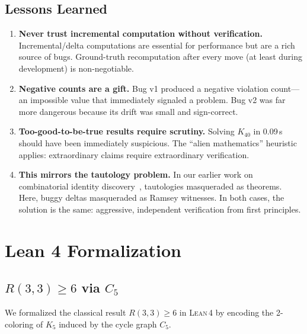 \documentclass[11pt,a4paper]{article}
\theoremstyle{definition}
\theoremstyle{remark}
\newcommand{\lean}{\textsc{Lean\,4}}
\begin{document}
\subsection{Lessons Learned}\label{sec:lessons}

\begin{enumerate}
  \item \textbf{Never trust incremental computation without verification.}
        Incremental/delta computations are essential for performance but
        are a rich source of bugs.  Ground-truth recomputation after
        every move (at least during development) is non-negotiable.

  \item \textbf{Negative counts are a gift.}
        Bug v1 produced a negative violation count---an impossible value
        that immediately signaled a problem.  Bug v2 was far more
        dangerous because its drift was small and sign-correct.

  \item \textbf{Too-good-to-be-true results require scrutiny.}
        Solving $K_{40}$ in 0.09\,s should have been immediately
        suspicious.  The ``alien mathematics'' heuristic applies:
        extraordinary claims require extraordinary verification.

  \item \textbf{This mirrors the tautology problem.}
        In our earlier work on combinatorial identity
        discovery~\cite{CallensIdentities2026}, tautologies masqueraded
        as theorems.  Here, buggy deltas masqueraded as Ramsey witnesses.
        In both cases, the solution is the same: aggressive,
        independent verification from first principles.
\end{enumerate}


\section{Lean 4 Formalization}\label{sec:lean}

\subsection{$R(3,3) \ge 6$ via $C_5$}\label{sec:lean-r33}

We formalized the classical result $R(3,3) \ge 6$ in \lean{} by encoding
the 2-coloring of $K_5$ induced by the cycle graph $C_5$.
\end{document}

